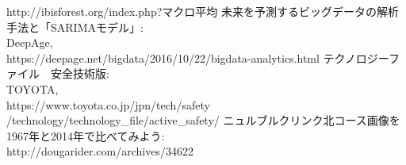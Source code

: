 \documentclass[twocolumn]{jsarticle}
\begin{document}
\begin{thebibliography}{99}
  \newblock http://ibisforest.org/index.php?マクロ平均
%
未来を予測するビッグデータの解析手法と「SARIMAモデル」:\\
  \newblock DeepAge,\\
  \newblock https://deepage.net/bigdata/2016/10/22/bigdata-analytics.html
%
テクノロジーファイル　安全技術版:\\
  \newblock TOYOTA,\\
  \newblock https://www.toyota.co.jp/jpn/tech/safety\\
  \newblock /technology/technology\_file/active\_safety/
%
ニュルブルクリンク北コース画像を1967年と2014年で比べてみよう:\\
  \newblock http://dougarider.com/archives/34622\\
\end{thebibliography}
\end{document}
